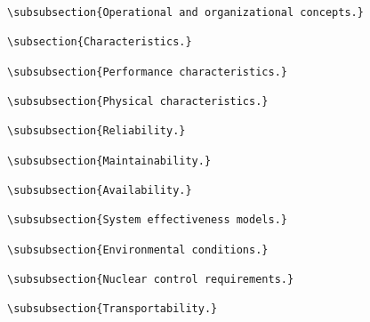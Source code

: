 \begin{itemize}
\begin{small}
\begin{verbatim}
\subsubsection{Operational and organizational concepts.}

\subsection{Characteristics.}

\subsubsection{Performance characteristics.}

\subsubsection{Physical characteristics.}

\subsubsection{Reliability.}

\subsubsection{Maintainability.}

\subsubsection{Availability.}

\subsubsection{System effectiveness models.}

\subsubsection{Environmental conditions.}

\subsubsection{Nuclear control requirements.}

\subsubsection{Transportability.}


\end{verbatim}
\end{small}
\end{itemize}
